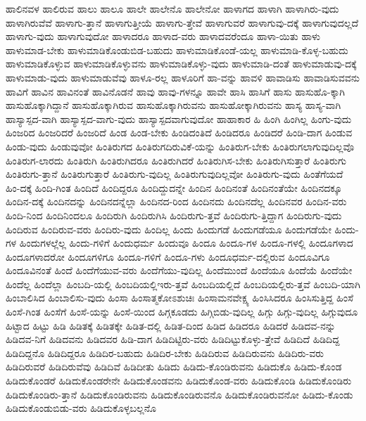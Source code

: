{ಹಾಲಿನವಳ
ಹಾಲಿರುವ
ಹಾಲು
ಹಾಲೂ
ಹಾಲೇ
ಹಾಲೇನೊ
ಹಾಲೇನೋ
ಹಾಳಾಗದ
ಹಾಳಾಗಿ
ಹಾಳಾಗಿರು-ವುದು
ಹಾಳಾಗಿರುವೆವೆ
ಹಾಳಾಗು-ತ್ತಾನೆ
ಹಾಳಾಗುತ್ತೀಯೆ
ಹಾಳಾಗು-ತ್ತೇವೆ
ಹಾಳಾಗುವರೆ
ಹಾಳಾಗುವು-ದಕ್ಕೆ
ಹಾಳಾಗುವುದಲ್ಲದೆ
ಹಾಳಾಗು-ವುದು
ಹಾಳಾಗುವುದೋ
ಹಾಳಾದರೂ
ಹಾಳಾದ-ವರು
ಹಾಳಾದವರೆಂದೂ
ಹಾಳಾ-ಯಿತು
ಹಾಳು
ಹಾಳುಮಾಡ-ಬೇಕು
ಹಾಳುಮಾಡಿಕೊಂಡುಬಿಡ-ಬಹುದು
ಹಾಳುಮಾಡಿಕೊಂಡೆ-ಯಲ್ಲ
ಹಾಳುಮಾಡಿ-ಕೊಳ್ಳ-ಬಹುದು
ಹಾಳುಮಾಡಿಕೊಳ್ಳುವ
ಹಾಳುಮಾಡಿಕೊಳ್ಳುವನು
ಹಾಳುಮಾಡಿಕೊಳ್ಳು-ವುದು
ಹಾಳುಮಾಡಿ-ದಂತೆ
ಹಾಳುಮಾಡುವು-ದಕ್ಕೆ
ಹಾಳುಮಾಡು-ವುದು
ಹಾಳುಮಾಡುವೆವು
ಹಾಳೂ-ರಲ್ಲ
ಹಾಳೂರಿಗೆ
ಹಾ-ವನ್ನು
ಹಾವಳಿ
ಹಾವಾಡಿಸು
ಹಾವಾಡಿಸುವವನು
ಹಾವಿಗೆ
ಹಾವಿನ
ಹಾವಿನಂತೆ
ಹಾವಿನೊಡನೆ
ಹಾವು
ಹಾವು-ಗಳನ್ನೂ
ಹಾವೇ
ಹಾಸಿ
ಹಾಸಿಗೆ
ಹಾಸು
ಹಾಸುಹೊ-ಕ್ಕಾಗಿ
ಹಾಸುಹೊಕ್ಕಾಗಿದ್ದಾನೆ
ಹಾಸುಹೊಕ್ಕಾಗಿರುವ
ಹಾಸುಹೊಕ್ಕಾಗಿರುವನು
ಹಾಸುಹೋಕ್ಕಾಗಿರುವನು
ಹಾಸ್ಯ
ಹಾಸ್ಯ-ವಾಗಿ
ಹಾಸ್ಯಾಸ್ಪದ-ವಾಗಿ
ಹಾಸ್ಯಾಸ್ಪದ-ವಾಗು-ವುದು
ಹಾಸ್ಯಾಸ್ಪದವಾಗುವುದೋ
ಹಾಹಾಕಾರ
ಹಿ
ಹಿಂಗಿ
ಹಿಂಗಿಲ್ಲ
ಹಿಂಗು-ವುದು
ಹಿಂಜರಿದ
ಹಿಂಜರಿದರೆ
ಹಿಂಜರಿದೆ
ಹಿಂಡ
ಹಿಂಡ-ಬೇಕು
ಹಿಂಡಿದಂತಿದೆ
ಹಿಂಡಿದರೂ
ಹಿಂಡಿದರೆ
ಹಿಂಡಿ-ದಾಗ
ಹಿಂಡುವ
ಹಿಂಡು-ವುದು
ಹಿಂಡುವುವೋ
ಹಿಂತಿರುಗದ
ಹಿಂತಿರುಗದಿರುವಿಕೆ-ಯನ್ನು
ಹಿಂತಿರುಗ-ಬೇಕು
ಹಿಂತಿರುಗಲಾಗುವುದಿಲ್ಲವೊ
ಹಿಂತಿರುಗ-ಲಾರದು
ಹಿಂತಿರುಗಿ
ಹಿಂತಿರುಗಿದರೂ
ಹಿಂತಿರುಗಿದರೆ
ಹಿಂತಿರುಗಿಸ-ಬೇಕು
ಹಿಂತಿರುಗಿಸುತ್ತಾರೆ
ಹಿಂತಿರುಗು
ಹಿಂತಿರುಗು-ತ್ತಾನೆ
ಹಿಂತಿರುಗುತ್ತಾರೆ
ಹಿಂತಿರುಗು-ವುದಿಲ್ಲ
ಹಿಂತಿರುಗುವುದಿಲ್ಲವೋ
ಹಿಂತಿರುಗು-ವುದು
ಹಿಂತೆಗೆಯದೆ
ಹಿಂ-ದಕ್ಕೆ
ಹಿಂದಿ-ಗಿಂತ
ಹಿಂದಿದೆ
ಹಿಂದಿದ್ದರೂ
ಹಿಂದಿದ್ದುದನ್ನೇ
ಹಿಂದಿನ
ಹಿಂದಿನಂತೆ
ಹಿಂದಿನಂತೆಯೇ
ಹಿಂದಿನದಕ್ಕೂ
ಹಿಂದಿನ-ದಕ್ಕೆ
ಹಿಂದಿನದನ್ನು
ಹಿಂದಿನದನ್ನೆಲ್ಲಾ
ಹಿಂದಿನದ-ರಿಂದ
ಹಿಂದಿನದು
ಹಿಂದಿನದೆಲ್ಲ
ಹಿಂದಿನವರ
ಹಿಂದಿನ-ವರು
ಹಿಂದಿ-ನಿಂದ
ಹಿಂದಿನಿಂದಲೂ
ಹಿಂದಿರುಗಿ
ಹಿಂದಿರುಗಿಸಿ
ಹಿಂದಿರುಗು-ತ್ತವೆ
ಹಿಂದಿರುಗು-ತ್ತಿದ್ದಾಗ
ಹಿಂದಿರುಗು-ವುದು
ಹಿಂದಿರುವ
ಹಿಂದಿರುವ-ವರು
ಹಿಂದಿರು-ವುದು
ಹಿಂದಿಲ್ಲ
ಹಿಂದು
ಹಿಂದುಗಡೆ
ಹಿಂದುಗಡೆಯೂ
ಹಿಂದುಗಡೆಯೇ
ಹಿಂದು-ಗಳ
ಹಿಂದುಗಳಲ್ಲೆಲ್ಲ
ಹಿಂದು-ಗಳಿಗೆ
ಹಿಂದುಧರ್ಮ
ಹಿಂದುವೂ
ಹಿಂದೂ
ಹಿಂದೂ-ಗಳ
ಹಿಂದೂ-ಗಳಲ್ಲಿ
ಹಿಂದೂಗಳಾದ
ಹಿಂದೂಗಳಾದರೋ
ಹಿಂದೂಗಳಿಗೂ
ಹಿಂದೂ-ಗಳಿಗೆ
ಹಿಂದೂ-ಗಳು
ಹಿಂದೂಧರ್ಮ-ದಲ್ಲಿರುವ
ಹಿಂದೂವಿಗೂ
ಹಿಂದೂವಿನಂತೆ
ಹಿಂದೆ
ಹಿಂದೆಗೆಯುವ-ವರು
ಹಿಂದೆಗೆಯು-ವುದಿಲ್ಲ
ಹಿಂದೆಮುಂದೆ
ಹಿಂದೆಯೂ
ಹಿಂದೆಯೆ
ಹಿಂದೆಯೇ
ಹಿಂದೆಲ್ಲ
ಹಿಂದೆಲ್ಲಾ
ಹಿಂಬದಿ-ಯಲ್ಲಿ
ಹಿಂಬದಿಯಲ್ಲಿಇರು-ತ್ತವೆ
ಹಿಂಬದಿಯಲ್ಲಿದೆ
ಹಿಂಬದಿಯಲ್ಲಿರು-ತ್ತವೆ
ಹಿಂಬದಿ-ಯಾಗಿ
ಹಿಂಬಾಲಿಸಿದ
ಹಿಂಬಾಲಿಸು-ವುದು
ಹಿಂಸಾ
ಹಿಂಸಾತ್ಮಕೋಽಶುಚಿಃ
ಹಿಂಸಾಮನವೇಕ್ಷ್ಯ
ಹಿಂಸಿಸಿದರೂ
ಹಿಂಸಿಸುತ್ತಿದ್ದ
ಹಿಂಸೆ
ಹಿಂಸೆ-ಗಿಂತ
ಹಿಂಸೆಗೆ
ಹಿಂಸೆ-ಯನ್ನು
ಹಿಂಸೆ-ಯಿಂದ
ಹಿಗ್ಗಕೂಡದು
ಹಿಗ್ಗಿಬಿಡು-ವುದಿಲ್ಲ
ಹಿಗ್ಗು
ಹಿಗ್ಗು-ವುದಿಲ್ಲ
ಹಿಗ್ಗುವುದೂ
ಹಿಟ್ಟಾದ
ಹಿಟ್ಟು
ಹಿಡಿ
ಹಿಡಿತಕ್ಕೆ
ಹಿಡಿತಕ್ಕೇ
ಹಿಡಿತ-ದಲ್ಲಿ
ಹಿಡಿತ-ದಿಂದ
ಹಿಡಿದ
ಹಿಡಿದರೂ
ಹಿಡಿದರೆ
ಹಿಡಿದವ-ನನ್ನು
ಹಿಡಿದವ-ನಿಗೆ
ಹಿಡಿದವನು
ಹಿಡಿದವರ
ಹಿಡಿ-ದಾಗ
ಹಿಡಿದಿಟ್ಟಿರು-ವರು
ಹಿಡಿದಿಟ್ಟುಕೊಳ್ಳು-ತ್ತೇವೆ
ಹಿಡಿದಿದೆ
ಹಿಡಿದಿದ್ದ
ಹಿಡಿದಿದ್ದನೊ
ಹಿಡಿದಿದ್ದರೂ
ಹಿಡಿದಿರ-ಬಹುದು
ಹಿಡಿದಿರ-ಬೇಕು
ಹಿಡಿದಿರುವ
ಹಿಡಿದಿರುವನು
ಹಿಡಿದಿರು-ವರು
ಹಿಡಿದಿರುವರೆ
ಹಿಡಿದಿರುವೆವು
ಹಿಡಿದಿವೆ
ಹಿಡಿದೀತು
ಹಿಡಿದು
ಹಿಡಿದು-ಕೊಂಡಿರುವನು
ಹಿಡಿದುಕೊ
ಹಿಡಿದು-ಕೊಂಡ
ಹಿಡಿದುಕೊಂಡರೆ
ಹಿಡಿದುಕೊಂಡರೇನೇ
ಹಿಡಿದುಕೊಂಡವನು
ಹಿಡಿದುಕೊಂಡ-ವರು
ಹಿಡಿದುಕೊಂಡಿ
ಹಿಡಿದುಕೊಂಡಿರು
ಹಿಡಿದುಕೊಂಡಿರು-ತ್ತಾನೆ
ಹಿಡಿದುಕೊಂಡಿರುವನು
ಹಿಡಿದುಕೊಂಡಿರುವನೊ
ಹಿಡಿದುಕೊಂಡಿರುವನೋ
ಹಿಡಿದು-ಕೊಂಡು
ಹಿಡಿದುಕೊಂಡುಬಿಡು-ವರು
ಹಿಡಿದುಕೊಳ್ಳಬಲ್ಲನೊ
}
